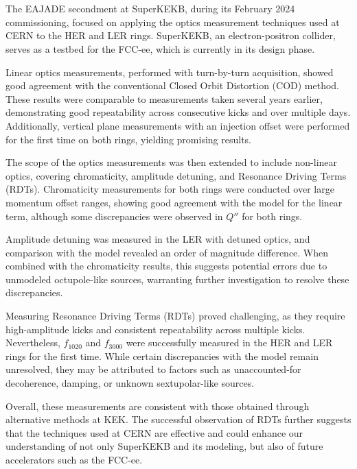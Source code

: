 \FloatBarrier
\section{}

The EAJADE secondment at SuperKEKB, during its February 2024 commissioning, focused on applying the
optics measurement techniques used at CERN to the HER and LER rings. SuperKEKB, an electron-positron
collider, serves as a testbed for the FCC-ee, which is currently in its design phase.

Linear optics measurements, performed with turn-by-turn acquisition, showed good agreement with the
conventional Closed Orbit Distortion (COD) method. These results were comparable to measurements
taken several years earlier, demonstrating good repeatability across consecutive kicks and over
multiple days. Additionally, vertical plane measurements with an injection offset were performed for
the first time on both rings, yielding promising results.

The scope of the optics measurements was then extended to include non-linear optics, covering
chromaticity, amplitude detuning, and Resonance Driving Terms (RDTs). Chromaticity measurements for
both rings were conducted over large momentum offset ranges, showing good agreement with the model
for the linear term, although some discrepancies were observed in $Q''$ for both rings.

Amplitude detuning was measured in the LER with detuned optics, and comparison with the model
revealed an order of magnitude difference. When combined with the chromaticity results, this
suggests potential errors due to unmodeled octupole-like sources, warranting further investigation
to resolve these discrepancies.

Measuring Resonance Driving Terms (RDTs) proved challenging, as they require high-amplitude kicks
and consistent repeatability across multiple kicks. Nevertheless, $f_{1020}$ and $f_{3000}$ were
successfully measured in the HER and LER rings for the first time. While certain discrepancies with
the model remain unresolved, they may be attributed to factors such as unaccounted-for decoherence,
damping, or unknown sextupolar-like sources.

Overall, these measurements are consistent with those obtained through alternative methods at KEK.
The successful observation of RDTs further suggests that the techniques used at CERN are effective
and could enhance our understanding of not only SuperKEKB and its modeling, but also of future
accelerators such as the FCC-ee.
